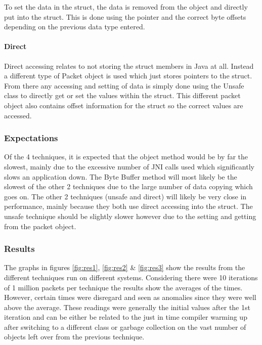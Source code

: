 \documentclass[final_report.tex]{subfiles}
\begin{document}
To set the data in the struct, the data is removed from the object and directly put into the struct. This is done using the pointer and the correct byte offsets depending on the previous data type entered.

\paragraph*{Direct}
Direct accessing relates to not storing the struct members in Java at all. Instead a different type of Packet object is used which just stores pointers to the struct. From there any accessing and setting of data is simply done using the Unsafe class to directly get or set the values within the struct. This different packet object also contains offset information for the struct so the correct values are accessed.

\subsubsection{Expectations}
Of the 4 techniques, it is expected that the object method would be by far the slowest, mainly due to the excessive number of JNI calls used which significantly slows an application down. The Byte Buffer method will most likely be the slowest of the other 2 techniques due to the large number of data copying which goes on. The other 2 techniques (unsafe and direct) will likely be very close in performance, mainly because they both use direct accessing into the struct. The unsafe technique should be slightly slower however due to the setting and getting from the packet object.

\newpage

\subsubsection{Results}
\label{sec:results}
The graphs in figures \ref{fig:res1}, \ref{fig:res2} \& \ref{fig:res3} show the results from the different techniques run on different systems. Considering there were 10 iterations of 1 million packets per technique the results show the averages of the times. However, certain times were disregard and seen as anomalies since they were well above the average. These readings were generally the initial values after the 1st iteration and can be either be related to the just in time compiler warming up after switching to a different class or garbage collection on the vast number of objects left over from the previous technique.
\end{document}
